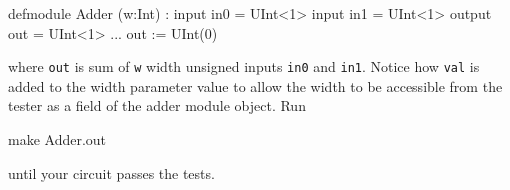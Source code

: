 \begin{stanza}
defmodule Adder (w:Int) :
  input  in0 = UInt<1>
  input  in1 = UInt<1>
  output out = UInt<1>
  ...
  out := UInt(0)
\end{stanza}

\noindent
where \verb+out+ is sum of \verb+w+ width unsigned inputs \verb+in0+ and \verb+in1+.  
Notice how \verb+val+ is added to the width parameter value to 
allow the width to be accessible from the tester as a field of the adder module object.  Run 

\begin{bash}
make Adder.out
\end{bash}

\noindent 
until your circuit passes the tests.


%
%


%
%
%

